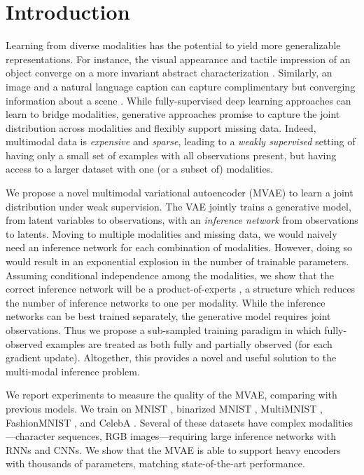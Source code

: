 \section{Introduction}
\label{sec:introduction}
Learning from diverse modalities has the potential to yield more  generalizable representations. For instance, the visual appearance and tactile impression of an object converge on a more invariant abstract characterization \cite{yildirim2014perception}.
Similarly, an image and a natural language caption can capture complimentary but converging information about a scene \cite{vinyals2015show, xu2015show}.
While fully-supervised deep learning approaches can learn to bridge modalities, generative approaches promise to capture the joint distribution across modalities and flexibly support missing data.
Indeed, multimodal data is \textit{expensive} and \textit{sparse}, leading to a \emph{weakly supervised} setting of having only a small set of examples with all observations present, but having access to a larger dataset with one (or a subset of) modalities.

We propose a novel multimodal variational autoencoder (MVAE) to learn a joint distribution under weak supervision. The VAE \cite{kingma2013auto} jointly trains a generative model, from latent variables to observations, with an \emph{inference network} from observations to latents. Moving to multiple modalities and missing data, we would naively need an inference network for each combination of modalities. However, doing so would result in an exponential explosion in the number of trainable parameters.
Assuming conditional independence among the modalities, we show that the correct inference network will be a product-of-experts \cite{hinton2006training}, a structure which reduces the number of inference networks to one per modality.
While the inference networks can be best trained separately, the generative model requires joint observations.
Thus we propose a sub-sampled training paradigm in which fully-observed examples are treated as both fully and partially observed (for each gradient update).
Altogether, this provides a novel and useful solution to the multi-modal inference problem.

We report experiments to measure the quality of the MVAE, comparing with previous models. We train on MNIST \cite{lecun1998gradient}, binarized MNIST \cite{larochelle2011neural}, MultiMNIST \cite{eslami2016attend, sabour2017dynamic}, FashionMNIST \cite{xiao2017fashion}, and CelebA \cite{liu2015faceattributes}. Several of these datasets have complex modalities---character sequences, RGB images---requiring large inference networks with RNNs and CNNs.
We show that the MVAE is able to support heavy encoders with thousands of parameters, matching state-of-the-art performance.

